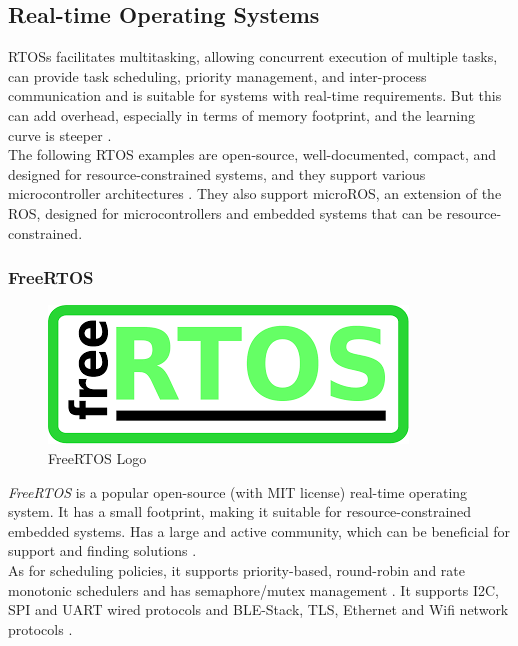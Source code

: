 \subsection{Real-time Operating Systems}
\glspl{RTOS} facilitates multitasking, allowing concurrent execution of multiple tasks, can provide task scheduling, priority management, and inter-process communication and is suitable for systems with real-time requirements.
But this can add overhead, especially in terms of memory footprint, and the learning curve is steeper \cite{RTOS1}.\\
The following \gls{RTOS} examples are open-source, well-documented, compact, and designed for resource-constrained systems, and they support various microcontroller architectures \cite{RTOS5}.
They also support microROS, an extension of the \gls{ROS}, designed for microcontrollers and embedded systems that can be resource-constrained.

\subsubsection{FreeRTOS}

\begin{figure}
    \begin{center}
        \includegraphics[scale=0.25]{ch3/assets/freertos.png}
    \end{center}
    \caption{FreeRTOS Logo}
\end{figure}

\textit{FreeRTOS} is a popular open-source (with MIT license) real-time operating system.
It has a small footprint, making it suitable for resource-constrained embedded systems.
Has a large and active community, which can be beneficial for support and finding solutions \cite{RTOS6}.
\\

As for scheduling policies, it supports priority-based, round-robin and rate monotonic schedulers and has semaphore/mutex management \cite{compRTOS}.
It supports \gls{I2C}, \gls{SPI} and \gls{UART} wired protocols and \gls{BLE}-Stack, \gls{TLS}, Ethernet and \gls{Wifi} network protocols \cite{compRTOS}.


